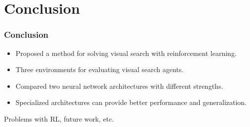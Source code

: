 \section{Conclusion}

\begin{frame}
    \frametitle{Conclusion}

    \begin{itemize}
        \item Proposed a method for solving visual search with reinforcement learning.
        \item Three environments for evaluating visual search agents.
        \item Compared two neural network architectures with different strengths.
        \item Specialized architectures can provide better performance and generalization.
    \end{itemize}

    Problems with RL, future work, etc.
\end{frame}
